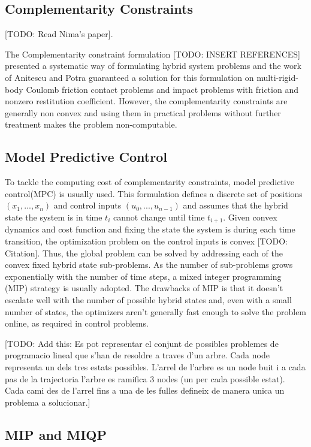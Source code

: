 \documentclass[12,twoside]{TFG-GM}
\theoremstyle{definition}
\theoremstyle{remark}
\begin{document}
\subsection{Complementarity Constraints}
\label{subsec:Complementarity Constraint}
[TODO: Read Nima's paper].

The Complementarity constraint formulation [TODO: INSERT REFERENCES] presented a systematic way of formulating hybrid system problems and the work of Anitescu and Potra \cite{lcc1} guaranteed a solution for this formulation on multi-rigid-body Coulomb friction contact problems and impact problems with friction and nonzero restitution coefficient. However, the complementarity constraints are generally non convex and using them in practical problems without further treatment makes the problem non-computable.

\subsection{Model Predictive Control}
\label{subsec:MPC}
To tackle the computing cost of complementarity constraints, model predictive control(MPC) is usually used. This formulation defines a discrete set of positions $(x_1, ..., x_n)$ and control inputs $(u_0, ..., u_{n-1})$ and assumes that the hybrid state the system is in time $t_i$ cannot change until time $t_{i+1}$. Given convex dynamics and cost function and fixing the state the system is during each time transition, the optimization problem on the control inputs is convex [TODO: Citation]. Thus, the global problem can be solved by addressing each of the convex fixed hybrid state sub-problems.
As the number of sub-problems grows exponentially with the number of time steps, a mixed integer programming (MIP) strategy is usually adopted. The drawbacks of MIP is that it doesn't escalate well with the number of possible hybrid states and, even with a small number of states, the optimizers aren't generally fast enough to solve the problem online, as required in control problems.

[TODO: Add this: Es pot representar el conjunt de possibles problemes de programacio lineal que s'han de resoldre a traves d'un arbre. Cada node representa un dels tres estats possibles. L'arrel de l'arbre es un node buit i a cada pas de la trajectoria l'arbre es ramifica 3 nodes (un per cada possible estat). Cada cami des de l'arrel fins a una de les fulles defineix de manera unica un problema a solucionar.]

\subsection{MIP and MIQP}
\label{subsec:intro_miqp}
\end{document}
